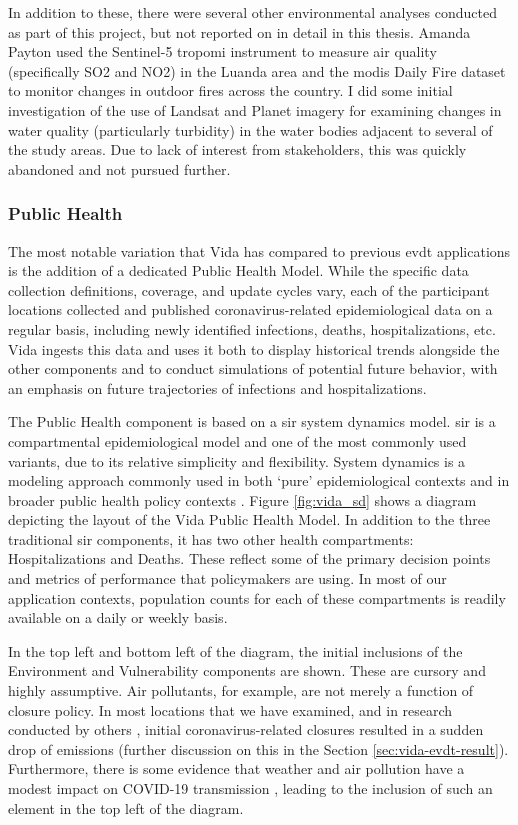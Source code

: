 In addition to these, there were several other environmental analyses conducted as part of this project, but not reported on in detail in this thesis. Amanda Payton used the Sentinel-5 \ac{tropomi} instrument to measure air quality (specifically SO2 and NO2) in the Luanda area and the \ac{modis} Daily Fire dataset to monitor changes in outdoor fires across the country. I did some initial investigation of the use of Landsat and Planet imagery for examining changes in water quality (particularly turbidity) in the water bodies adjacent to several of the study areas. Due to lack of interest from stakeholders, this was quickly abandoned and not pursued further.

\subsubsection{Public Health} \label{sec:vida-evdt-method-p}

The most notable variation that Vida has compared to previous \ac{evdt} applications is the addition of a dedicated Public Health Model. While the specific data collection definitions, coverage, and update cycles vary, each of the participant locations collected and published coronavirus-related epidemiological data on a regular basis, including newly identified infections, deaths, hospitalizations, etc. Vida ingests this data and uses it both to display historical trends alongside the other components and to conduct simulations of potential future behavior, with an emphasis on future trajectories of infections and hospitalizations. 

The Public Health component is based on a \ac{sir} system dynamics model. \ac{sir} is a compartmental epidemiological model and one of the most commonly used variants, due to its relative simplicity and flexibility. System dynamics is a modeling approach commonly used in both `pure' epidemiological contexts \cite{homerSystemDynamicsModeling2006} and in broader public health policy contexts \cite{deutschCommunitybasedSystemDynamics2020}. Figure \ref{fig:vida_sd} shows a diagram depicting the layout of the Vida Public Health Model. In addition to the three traditional \ac{sir} components, it has two other health compartments: Hospitalizations and Deaths. These reflect some of the primary decision points and metrics of performance that policymakers are using. In most of our application contexts, population counts for each of these compartments is readily available on a daily or weekly basis. 

In the top left and bottom left of the diagram, the initial inclusions of the Environment and Vulnerability components are shown. These are cursory and highly assumptive. Air pollutants, for example, are not merely a function of closure policy. In most locations that we have examined, and in research conducted by others \cite{isaifanDramaticImpactCoronavirus2020}, initial coronavirus-related closures resulted in a sudden drop of emissions (further discussion on this in the Section \ref{sec:vida-evdt-result}). Furthermore, there is some evidence that weather and air pollution have a modest impact on COVID-19 transmission \cite{xuModestImpactWeather2020}, leading to the inclusion of such an element in the top left of the diagram.

